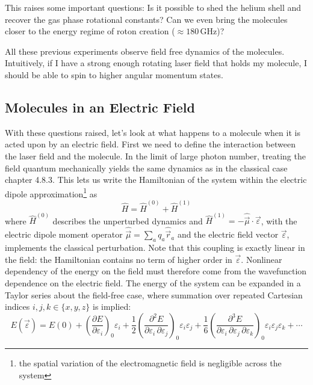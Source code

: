 This raises some important questions:
Is it possible to shed the helium shell and recover the gas phase rotational constants? Can we even bring the molecules closer to the energy regime of roton creation ($\approx 180 \, \mathrm{GHz}$)?

All these previous experiments observe field free dynamics of the molecules. Intuitively, if I have a strong enough rotating laser field that holds my molecule, I should be able to spin to higher angular momentum states.

\subsection{Molecules in an Electric Field}
\label{sec:molecules_in_efield}

With these questions raised, let's look at what happens to a molecule when it is acted upon by an electric field. First we need to define the interaction between the laser field and the molecule. In the limit of large photon number, treating the field quantum mechanically yields the same dynamics as in the classical case \cite{kremsMoleculesElectromagneticFields2019} chapter 4.8.3. This lets us write the Hamiltonian of the system within the electric dipole approximation\footnote{the spatial variation of the electromagnetic field is negligible across the system} as
\begin{equation}
    \hat H = \hat H^{(0)} + \hat H^{(1)}
    \label{eq:hamiltonian_split}
\end{equation}
where $\hat H^{(0)}$ describes the unperturbed dynamics and $\hat H^{(1)} = -\hat{\vec\mu}\cdot\vec\varepsilon$, with the electric dipole moment operator $\hat{\vec\mu} = \sum_a q_a \hat{\vec r}_a$ and the electric field vector $\vec\varepsilon$, implements the classical perturbation. Note that this coupling is exactly linear in the field: the Hamiltonian contains no term of higher order in $\vec\varepsilon$. Nonlinear dependency of the energy on the field must therefore come from the wavefunction dependence on the electric field. The energy of the system can be expanded in a Taylor series about the field-free case, where summation over repeated Cartesian indices $i,j,k \in \{x,y,z\}$ is implied:
\begin{equation}
    E(\vec\varepsilon) = E(0) + \left(\frac{\partial E}{\partial\varepsilon_i}\right)_{\!0}\varepsilon_i + \frac{1}{2}\left(\frac{\partial^2 E}{\partial\varepsilon_i\,\partial\varepsilon_j}\right)_{\!0}\varepsilon_i\varepsilon_j + \frac{1}{6}\left(\frac{\partial^3 E}{\partial\varepsilon_i\,\partial\varepsilon_j\,\partial\varepsilon_k}\right)_{\!0}\varepsilon_i\varepsilon_j\varepsilon_k + \cdots
    \label{eq:energy_expansion}
\end{equation}
